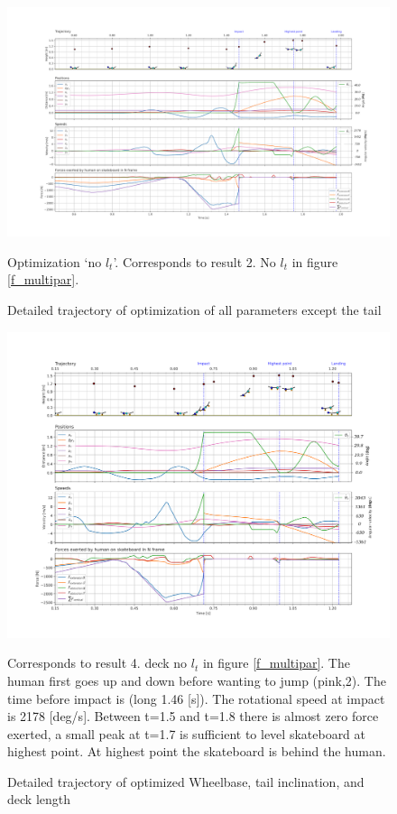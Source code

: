 \documentclass[default,iicol]{sn-jnl}
\begin{document}
{\begin{figure}[t]
    \includegraphics[trim={0cm 0cm 0cm 0cm},clip,width=\textwidth]{figure/Results/data_no_taildpi600.png}
    \caption[Trajectory, positions, speeds, and forces for `all except tail length' optimization]{Detailed trajectory of optimization of all parameters except the tail}\label{f_notail}
    Optimization `no $l_t$'. Corresponds to result 2. No $l_t$ in figure \ref{f_multipar}.
    
\end{figure}
\begin{figure}[t]
    \includegraphics[trim={0cm 0cm 0cm 0cm},clip,width=\textwidth]{figure/Results/data_notrrwltdpi600.png}
    \vspace{-0.5cm}\caption[Trajectory, positions, speeds, and forces for `deck except tail length' optimization]{Detailed trajectory of optimized Wheelbase, tail inclination, and deck length}\label{f_notailnotruck}
    Corresponds to result 4. deck no $l_t$ in figure \ref{f_multipar}. The human first goes up and down before wanting to jump (pink,2). The time before impact is (long 1.46 [s]). The rotational speed at impact is 2178 [deg/s]. Between t=1.5 and t=1.8 there is almost zero force exerted, a small peak at t=1.7 is sufficient to level skateboard at highest point. At highest point the skateboard is behind the human.
\end{figure}

}
\end{document}
